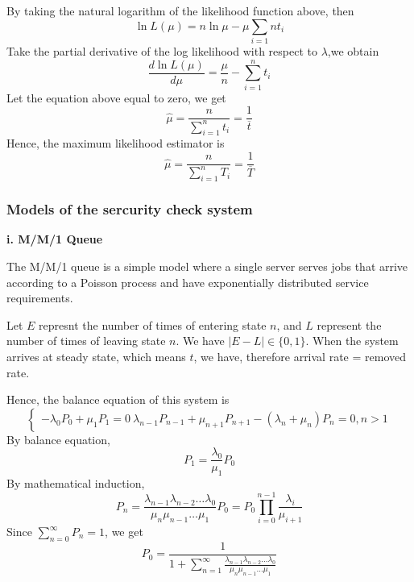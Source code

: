 \documentclass{mcmthesis}
\begin{document}
		By taking  the natural logarithm of the likelihood function above, then
			$${{\ln L(\mu)} = n\ln \mu - \mu \sum_{i=1}{n}t_i}$$
		Take the partial derivative of the log likelihood with respect to ${\lambda}$,we obtain
			$${ \frac {d \ln L(\mu)}{d \mu} = \frac {\mu}{n} -\sum_{i=1}^{n} t_i }$$
		Let the equation above equal to zero, we get
			\begin{equation}
				\hat \mu = \frac{n}{\sum\limits_{i=1}^{n} t_i} = \frac {1}{ \overline t}
 			\end{equation}
		Hence, the  maximum likelihood estimator is
			\begin{equation}
				\hat \mu = \frac{n}{\sum\limits_{i=1}^{n} T_i} = \frac {1}{ \overline T}
			\end{equation}		
			
	\subsubsection{Models of the sercurity check system}%
		\par{\bf i. M/M/1 Queue}%
			\par The M/M/1 queue is a simple model where a single server serves jobs that arrive according to a Poisson process and have exponentially distributed service requirements. 
			
			Let ${E}$ represnt the number of times of entering state ${n}$, and ${L}$ represent the number of times of leaving state ${n}$. We have ${|E - L| \in \{0,1\}}$. When the system arrives at steady state, which means ${t}$, we have, therefore arrival rate = removed rate.
			
			Hence, the balance equation of this system is 
				\begin{equation}    
					\left  \{
       						\begin{array}{lr}
        						   - \lambda _0 P_0 + \mu _1 P_1 = 0\
        						   \lambda _{n-1} P_{n-1} + \mu _{n+1} P_{n+1} -(\lambda _n + \mu _n ) P_n = 0,n>1
  					      \end{array}
					\right.
				\end{equation}
			By balance equation, 
			$${P_1 = \frac{\lambda _0}{ \mu _1}P_0 }$$
			By mathematical induction,
				\begin{equation}
					P_n = \frac {\lambda _{n-1} \lambda _{n-2} \dots \lambda_0}{\mu _n \mu_{n-1} \dots \mu _1}P_0 = P_0\prod_{i=0}^{n-1} \frac{\lambda _i}{\mu _{i+1}}  
				\end{equation}
			Since ${\sum\limits_{n=0}^{ \infty } P_n = 1}$, we get
				\begin{equation}
					P_0 = \frac{1}{1 + \sum\limits_{n=1}^{ \infty} \frac {\lambda _{n-1} \lambda _{n-2} \dots \lambda_0}{\mu _n \mu_{n-1} \dots \mu _1}}
				\end{equation}
				
\end{document}
